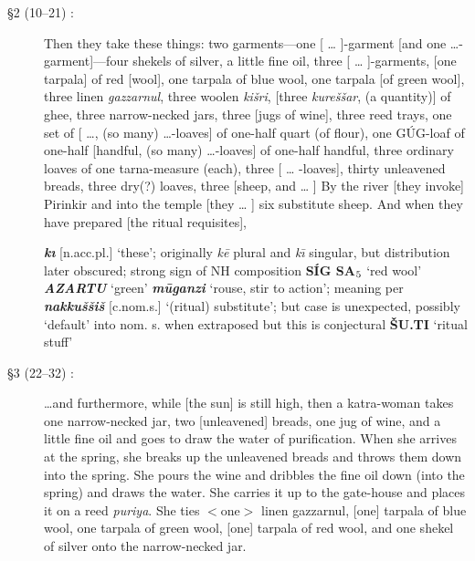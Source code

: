 \documentclass[10pt]{article}
\newcommand{\subsc}[1]{$_{\textrm{\scriptsize{#1}}}$}	%
\newcommand{\bit}[1]{\textbf{\textit{#1}}}				%
\newcommand{\p}[1]{{\tiny[{#1}]}}					%
\newcommand{\I}{\={\i}}									%
\newcommand{\Hith}{\textsubwedge{H}}
\renewcommand{\.}[1]{\textsubdot{#1}}
\begin{document}
\begin{description}
\item[\S2 (10--21) :] Then they take these things: two garments---one [ {\ldots} ]-garment [and one
{\ldots}-garment]---four shekels of silver, a little fine oil, three [ {\ldots} ]-garments, [one tarpala] of red [wool], one tarpala of blue wool, one tarpala [of green wool], three linen \textit{gazzarnul}, three woolen \textit{ki\v{s}ri}, [three \textit{kure\v{s}\v{s}ar}, (a quantity)] of ghee, three narrow-necked jars, three [jugs of wine], three reed trays, one set of [ {\ldots}, (so many) {\ldots}-loaves] of one-half quart (of flour), one G\'UG-loaf of one-half [handful, (so many) {\ldots}-loaves] of one-half handful, three ordinary loaves of one tarna-measure (each), three [ {\ldots} -loaves], thirty unleavened breads, three dry(?) loaves, three [sheep, and {\ldots} ] By the river [they invoke] Pirinkir and into the temple [they {\ldots} ] six substitute sheep. And when they have prepared [the ritual requisites],


\begin{notes}

\bit{k{\i}} \p{n.acc.pl.} `these'; originally \textit{k\=e} plural and \textit{k{\I}} singular, but distribution later obscured; strong sign of NH composition \textbf{S\'IG SA\subsc{5}} `red wool' \bit{{\Hith}AZARTU} `green' \bit{m\=uganzi} `rouse, stir to action'; meaning per \citet{melchert2010mugai} \bit{nakku\v{s}\v{s}i\v{s}} \p{c.nom.s.} `(ritual) substitute'; but case is unexpected, possibly `default' into nom. s. when extraposed but this is conjectural \textbf{\v{S}U.TI} `ritual stuff'

\end{notes}


\item[\S3 (22--32) :] {\ldots}and furthermore, while [the sun] is still high, then a katra-woman takes one narrow-necked jar, two [unleavened] breads, one jug of wine, and a little fine oil and goes to draw the water of purification. When she arrives at the spring, she breaks up the unleavened breads and throws them down into the spring. She pours the wine and dribbles the fine oil down (into the spring) and draws the water. She carries it up to the gate-house and places it on a reed \textit{puriya}. She ties $<$one$>$ linen gazzarnul, [one] tarpala of blue wool, one tarpala of green wool, [one] tarpala of red wool, and one shekel of silver onto the narrow-necked jar.

\begin{notes}


\end{notes}
\end{description}
\end{document}
